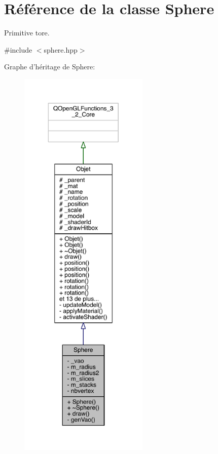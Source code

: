 \hypertarget{class_sphere}{\section{Référence de la classe Sphere}
\label{class_sphere}
}


Primitive tore.  




{\ttfamily \#include $<$sphere.\+hpp$>$}



Graphe d'héritage de Sphere\+:
\nopagebreak
\begin{figure}[H]
\begin{center}
\leavevmode
\includegraphics[height=550pt]{class_sphere__inherit__graph}
\end{center}
\end{figure}


